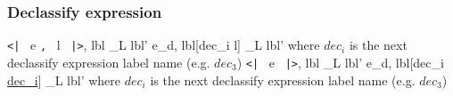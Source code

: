 \subsubsection{Declassify expression}

      {\langle \texttt{<|} \, e \texttt{,} \, l \, \texttt{|>}, lbl \rangle \rightarrow_L lbl'}
      {\langle e_d, lbl[dec_i \mapsto l] \rangle \rightarrow_L lbl'}
      {where $dec_i$ is the next declassify expression label name (e.g. $dec_3$)}
      {\langle \texttt{<|} \, e \, \texttt{|>}, lbl \rangle \rightarrow_L lbl'}
      {\langle e_d, lbl[dec_i \mapsto \underline{dec_i}] \rangle \rightarrow_L lbl'}
      {where $dec_i$ is the next declassify expression label name (e.g. $dec_3$)}


